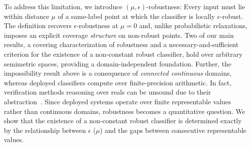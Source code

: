 To address this limitation, we introduce $(\mu,\epsilon)$-robustness:
Every input must lie within distance $\mu$ of a same-label point at which the classifier is locally $\epsilon$-robust. 
The definition recovers $\epsilon$-robustness at $\mu = 0$ and, unlike probabilistic
relaxations, imposes an explicit coverage \emph{structure} on non-robust points.
Two of our main results, a covering characterization of robustness and a necessary-and-sufficient criterion for the
existence of a non-constant robust classifier, hold over arbitrary semimetric spaces,
providing a domain-independent foundation.
Further, the impossibility result above is a consequence of \emph{connected
continuous} domains, whereas deployed classifiers compute over finite-precision
arithmetic. In fact, verification methods reasoning over reals can be unsound 
due to their abstraction~\cite{jia2021exploiting,cordeiro2025neural}. 
Since deployed systems operate over finite representable values rather than continuous domains, robustness becomes a quantitative question.
We show that the existence of a non-constant robust classifier is determined exactly 
by the relationship between $\epsilon$ ($\mu$) and the gaps between consecutive representable values. 

